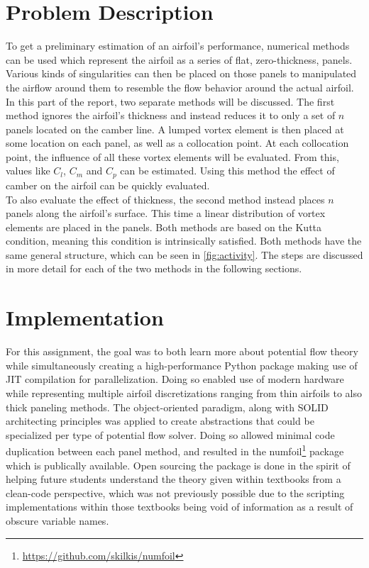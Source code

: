 \newcommand{\numfoil}{\textsf{numfoil}}
\newcommand{\xfoil}{\textsf{XFOIL}\ }
\chapter{Problem Description}
To get a preliminary estimation of an airfoil's performance, numerical methods
can be used which represent the airfoil as a series of flat, zero-thickness,
panels. Various kinds of singularities can then be placed on those panels to
manipulated the airflow around them to resemble the flow behavior around the
actual airfoil.\\

In this part of the report, two separate methods will be discussed.
The first method ignores the airfoil's thickness and instead reduces it to only
a set of $n$ panels located on the camber line. A lumped vortex element is then
placed at some location on each panel, as well as a collocation point. At each
collocation point, the influence of all these vortex elements will be evaluated.
From this, values like $C_l$, $C_m$ and $C_p$ can be estimated. Using this
method the effect of camber on the airfoil can be quickly evaluated.\\

To also evaluate the effect of thickness, the second method instead places $n$
panels along the airfoil's surface. This time a linear distribution of vortex
elements are placed in the panels. Both methods are based on the Kutta
condition, meaning this condition is intrinsically satisfied. Both methods have
the same general structure, which can be seen in \autoref{fig:activity}. The
steps are discussed in more detail for each of the two methods in the following
sections.

\chapter{Implementation}
For this assignment, the goal was to both learn more about potential flow
theory while simultaneously creating a high-performance Python package making
use of JIT compilation for parallelization. Doing so enabled use of modern
hardware while representing multiple airfoil discretizations ranging from thin
airfoils to also thick paneling methods. The object-oriented paradigm, along
with SOLID architecting principles was applied to create abstractions that
could be specialized per type of potential flow solver. Doing so allowed
minimal code duplication between each panel method, and resulted in the
\numfoil\footnote{\url{https://github.com/skilkis/numfoil}} package which is
publically available. Open sourcing the package is done in the spirit of
helping future students understand the theory given within textbooks from a
clean-code perspective, which was not previously possible due to the scripting
implementations within those textbooks being void of information as a result of
obscure variable names.\\

